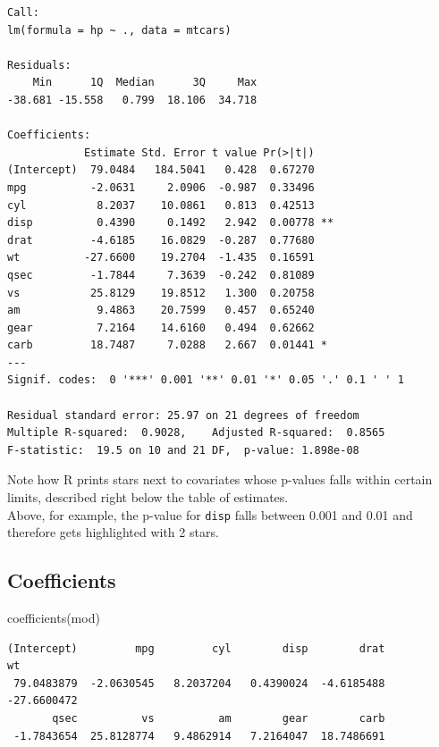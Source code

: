 \documentclass[
]{book}
\newenvironment{Shaded}{\begin{snugshade}}{\end{snugshade}}
\newcommand{\FunctionTok}[1]{\textcolor[rgb]{0.00,0.00,0.00}{#1}}
\newcommand{\NormalTok}[1]{#1}
\begin{document}
\begin{verbatim}
Call:
lm(formula = hp ~ ., data = mtcars)

Residuals:
    Min      1Q  Median      3Q     Max 
-38.681 -15.558   0.799  18.106  34.718 

Coefficients:
            Estimate Std. Error t value Pr(>|t|)   
(Intercept)  79.0484   184.5041   0.428  0.67270   
mpg          -2.0631     2.0906  -0.987  0.33496   
cyl           8.2037    10.0861   0.813  0.42513   
disp          0.4390     0.1492   2.942  0.00778 **
drat         -4.6185    16.0829  -0.287  0.77680   
wt          -27.6600    19.2704  -1.435  0.16591   
qsec         -1.7844     7.3639  -0.242  0.81089   
vs           25.8129    19.8512   1.300  0.20758   
am            9.4863    20.7599   0.457  0.65240   
gear          7.2164    14.6160   0.494  0.62662   
carb         18.7487     7.0288   2.667  0.01441 * 
---
Signif. codes:  0 '***' 0.001 '**' 0.01 '*' 0.05 '.' 0.1 ' ' 1

Residual standard error: 25.97 on 21 degrees of freedom
Multiple R-squared:  0.9028,    Adjusted R-squared:  0.8565 
F-statistic:  19.5 on 10 and 21 DF,  p-value: 1.898e-08
\end{verbatim}

Note how R prints stars next to covariates whose p-values falls within certain limits, described right below the table of estimates.\\
Above, for example, the p-value for \texttt{disp} falls between 0.001 and 0.01 and therefore gets highlighted with 2 stars.

\hypertarget{coefficients}{%
\subsection{Coefficients}\label{coefficients}}

\begin{Shaded}
\begin{Highlighting}[]
\FunctionTok{coefficients}\NormalTok{(mod)}
\end{Highlighting}
\end{Shaded}

\begin{verbatim}
(Intercept)         mpg         cyl        disp        drat          wt 
 79.0483879  -2.0630545   8.2037204   0.4390024  -4.6185488 -27.6600472 
       qsec          vs          am        gear        carb 
 -1.7843654  25.8128774   9.4862914   7.2164047  18.7486691 
\end{verbatim}
\end{document}
